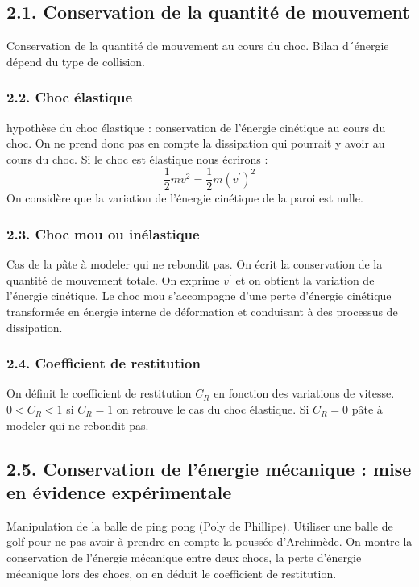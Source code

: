 \documentclass[french, a4paper, 10pt, twocolumn, landscape]{article}
\begin{document}
\subsection*{2.1. Conservation de la quantité de mouvement}
Conservation de la quantité de mouvement au cours du choc.
Bilan d´énergie dépend du type de collision.
\subsubsection*{2.2. Choc élastique}
hypothèse du choc élastique : conservation de l'énergie cinétique au cours du choc. On ne prend donc pas en compte la dissipation qui pourrait y avoir au cours du choc.
Si le choc est élastique  nous écrirons : 
\begin{equation}
    \dfrac{1}{2}mv^2=\dfrac{1}{2}m (v^\prime)^2
\end{equation}
On considère que la variation de l'énergie cinétique de la paroi est nulle. 

\subsubsection*{2.3. Choc mou ou inélastique}
Cas de la pâte à modeler qui ne rebondit pas. On écrit la conservation de la quantité de mouvement totale. On exprime $v^\prime$ et on obtient la variation de l'énergie cinétique. Le choc mou s'accompagne d'une perte d'énergie cinétique transformée en énergie interne de déformation et conduisant à des processus de dissipation. 

\subsubsection*{2.4. Coefficient de restitution}

On définit le coefficient de restitution $C_R$ en fonction des variations de vitesse. $0<C_R<1$ si $C_R=1$ on retrouve le cas du choc élastique. Si $C_R=0$ pâte à modeler qui ne rebondit pas.
\subsection*{2.5. Conservation de l'énergie mécanique : mise en évidence expérimentale}

Manipulation de la balle de ping pong (Poly de Phillipe). Utiliser une balle de golf pour ne pas avoir à prendre en compte la poussée d'Archimède. On montre la conservation de l'énergie mécanique entre deux chocs, la perte d'énergie mécanique lors des chocs, on en déduit le coefficient de restitution.
\end{document}
